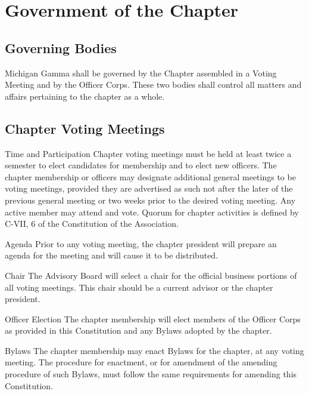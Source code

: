 \chapter{Government of the Chapter}

\section{Governing Bodies}
Michigan Gamma shall be governed by the Chapter assembled in a Voting Meeting and by the Officer Corps. These two bodies shall control all matters and affairs pertaining to the chapter as a whole.

\section{Chapter Voting Meetings}
\begin{enumsubsection}
\item{Time and Participation} Chapter voting meetings must be held at least twice a semester to elect candidates for membership and to elect new officers. The chapter membership or officers may designate additional general meetings to be voting meetings, provided they are advertised as such not after the later of the previous general meeting or two weeks prior to the desired voting meeting. Any active member may attend and vote. Quorum for chapter activities is defined by C-VII, 6 of the Constitution of the Association.

\item{Agenda}
Prior to any voting meeting, the chapter president will prepare an agenda for the meeting and will cause it to be distributed.

\item{Chair}
The Advisory Board will select a chair for the official business portions of all voting meetings. This chair should be a current advisor or the chapter president.

\item{Officer Election}
The chapter membership will elect members of the Officer Corps as provided in this Constitution and any Bylaws adopted by the chapter.

\item{Bylaws}
The chapter membership may enact Bylaws for the chapter, at any voting meeting. The procedure for enactment, or for amendment of the amending procedure of such Bylaws, must follow the same requirements for amending this Constitution.

\end{enumsubsection}
